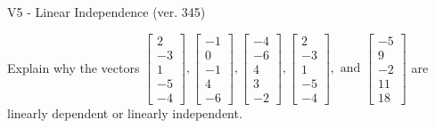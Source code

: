 \begin{exercise}
  \begin{exerciseTitle}V5 - Linear Independence (ver. 345)\end{exerciseTitle}
  \begin{exerciseStatement}
    Explain why the vectors \(\left[\begin{array}{r}
2 \\
-3 \\
1 \\
-5 \\
-4
\end{array}\right] , \left[\begin{array}{r}
-1 \\
0 \\
-1 \\
4 \\
-6
\end{array}\right] , \left[\begin{array}{r}
-4 \\
-6 \\
4 \\
3 \\
-2
\end{array}\right] , \left[\begin{array}{r}
2 \\
-3 \\
1 \\
-5 \\
-4
\end{array}\right] , \text{ and } \left[\begin{array}{r}
-5 \\
9 \\
-2 \\
11 \\
18
\end{array}\right]\) are linearly dependent or linearly independent.	



\end{exerciseStatement}
\end{exercise}
